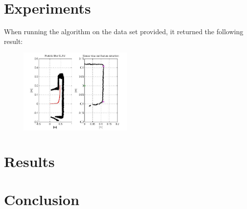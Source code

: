 \documentclass[12pt]{article}
\begin{document}
\section{Experiments}
When running the algorithm on the data set provided, it returned the following result:
\begin{figure}[h!]
	\centering
	\includegraphics[width=0.5\textwidth]{normal.jpg}
\end{figure}
\section{Results}

\section{Conclusion}
\end{document}
